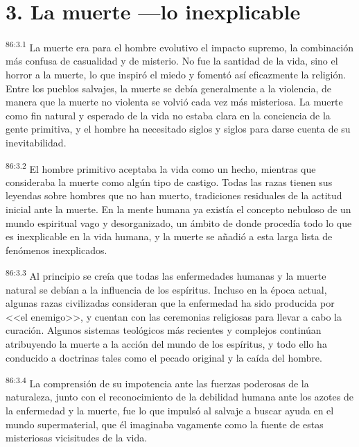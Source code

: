 \documentclass[twoside, 11pt]{book}
\begin{document}
\section*{3. La muerte ---lo inexplicable}
\par
\textsuperscript{86:3.1} La muerte era para el hombre evolutivo el impacto supremo, la combinación más confusa de casualidad y de misterio. No fue la santidad de la vida, sino el horror a la muerte, lo que inspiró el miedo y fomentó así eficazmente la religión. Entre los pueblos salvajes, la muerte se debía generalmente a la violencia, de manera que la muerte no violenta se volvió cada vez más misteriosa. La muerte como fin natural y esperado de la vida no estaba clara en la conciencia de la gente primitiva, y el hombre ha necesitado siglos y siglos para darse cuenta de su inevitabilidad.

\par
\textsuperscript{86:3.2} El hombre primitivo aceptaba la vida como un hecho, mientras que consideraba la muerte como algún tipo de castigo. Todas las razas tienen sus leyendas sobre hombres que no han muerto, tradiciones residuales de la actitud inicial ante la muerte. En la mente humana ya existía el concepto nebuloso de un mundo espiritual vago y desorganizado, un ámbito de donde procedía todo lo que es inexplicable en la vida humana, y la muerte se añadió a esta larga lista de fenómenos inexplicados.

\par
\textsuperscript{86:3.3} Al principio se creía que todas las enfermedades humanas y la muerte natural se debían a la influencia de los espíritus. Incluso en la época actual, algunas razas civilizadas consideran que la enfermedad ha sido producida por <<el enemigo>>, y cuentan con las ceremonias religiosas para llevar a cabo la curación. Algunos sistemas teológicos más recientes y complejos continúan atribuyendo la muerte a la acción del mundo de los espíritus, y todo ello ha conducido a doctrinas tales como el pecado original y la caída del hombre.

\par
\textsuperscript{86:3.4} La comprensión de su impotencia ante las fuerzas poderosas de la naturaleza, junto con el reconocimiento de la debilidad humana ante los azotes de la enfermedad y la muerte, fue lo que impulsó al salvaje a buscar ayuda en el mundo supermaterial, que él imaginaba vagamente como la fuente de estas misteriosas vicisitudes de la vida.
\end{document}
